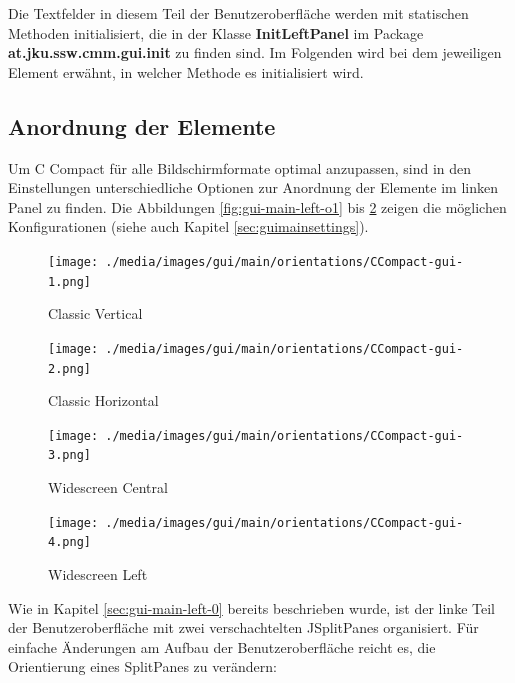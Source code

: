 Die Textfelder in diesem Teil der Benutzeroberfläche werden mit statischen Methoden initialisiert, die in der Klasse \textbf{InitLeftPanel} im Package \textbf{at.jku.ssw.cmm.gui.init} zu finden sind. Im Folgenden wird bei dem jeweiligen Element erwähnt, in welcher Methode es initialisiert wird.

\pagebreak
\subsection{Anordnung der Elemente}
\label{sec:gui-main-left-ord}

Um C Compact für alle Bildschirmformate optimal anzupassen, sind in den Einstellungen unterschiedliche Optionen zur Anordnung der Elemente im linken Panel zu finden. Die Abbildungen \ref{fig:gui-main-left-o1} bis \ref{fig:gui-main-left-o4} zeigen die möglichen Konfigurationen (siehe auch Kapitel \ref{sec:guimainsettings}).

\begin{figure}[h!]
\centering
	\begin{minipage}{0.45\textwidth}
		\centering
		\texttt{[image: ./media/images/gui/main/orientations/CCompact-gui-1.png]}
		\caption{Classic Vertical}\label{fig:gui-main-left-o1}
	\end{minipage}\hfill
	\begin{minipage}{0.45\textwidth}
		\centering
		\texttt{[image: ./media/images/gui/main/orientations/CCompact-gui-2.png]}
		\caption{Classic Horizontal}\label{fig:gui-main-left-o2}
	\end{minipage}
\end{figure}

\begin{figure}[h!]
\centering
	\begin{minipage}{0.45\textwidth}
		\centering
		\texttt{[image: ./media/images/gui/main/orientations/CCompact-gui-3.png]}
		\caption{Widescreen Central}\label{fig:gui-main-left-o3}
	\end{minipage}\hfill
	\begin{minipage}{0.45\textwidth}
		\centering
		\texttt{[image: ./media/images/gui/main/orientations/CCompact-gui-4.png]}
		\caption{Widescreen Left}\label{fig:gui-main-left-o4}
	\end{minipage}
\end{figure}

Wie in Kapitel \ref{sec:gui-main-left-0} bereits beschrieben wurde, ist der linke Teil der Benutzeroberfläche mit zwei verschachtelten JSplitPanes organisiert. Für einfache Änderungen am Aufbau der Benutzeroberfläche reicht es, die Orientierung eines SplitPanes zu verändern:

